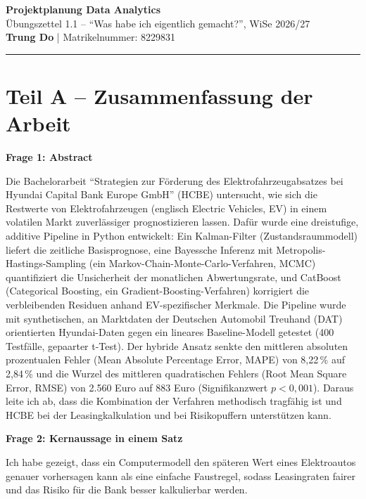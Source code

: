 \documentclass[a4paper,9pt]{article}
\begin{document}
\pagestyle{empty}

\begin{center}
\textbf{\large Projektplanung Data Analytics} \\
\small Übungszettel 1.1 -- \enquote{Was habe ich eigentlich gemacht?}, WiSe 2026/27 \\
\textbf{Trung Do} | Matrikelnummer: 8229831
\end{center}
\vspace{-3mm}
\noindent\rule{\textwidth}{0.3pt}

\section*{Teil A -- Zusammenfassung der Arbeit}

\textbf{Frage 1: Abstract}

Die Bachelorarbeit \enquote{Strategien zur Förderung des Elektrofahrzeugabsatzes bei Hyundai Capital Bank Europe GmbH} (HCBE) untersucht, wie sich die Restwerte von Elektrofahrzeugen (englisch Electric Vehicles, EV) in einem volatilen Markt zuverlässiger prognostizieren lassen. Dafür wurde eine dreistufige, additive Pipeline in Python entwickelt: Ein Kalman-Filter (Zustandsraummodell) liefert die zeitliche Basisprognose, eine Bayessche Inferenz mit Metropolis-Hastings-Sampling (ein Markov-Chain-Monte-Carlo-Verfahren, MCMC) quantifiziert die Unsicherheit der monatlichen Abwertungsrate, und CatBoost (Categorical Boosting, ein Gradient-Boosting-Verfahren) korrigiert die verbleibenden Residuen anhand EV-spezifischer Merkmale. Die Pipeline wurde mit synthetischen, an Marktdaten der Deutschen Automobil Treuhand (DAT) orientierten Hyundai-Daten gegen ein lineares Baseline-Modell getestet (400 Testfälle, gepaarter t-Test). Der hybride Ansatz senkte den mittleren absoluten prozentualen Fehler (Mean Absolute Percentage Error, MAPE) von 8,22\,\% auf 2,84\,\% und die Wurzel des mittleren quadratischen Fehlers (Root Mean Square Error, RMSE) von 2.560 Euro auf 883 Euro (Signifikanzwert $p<0{,}001$). Daraus leite ich ab, dass die Kombination der Verfahren methodisch tragfähig ist und HCBE bei der Leasingkalkulation und bei Risikopuffern unterstützen kann.

\textbf{Frage 2: Kernaussage in einem Satz}

Ich habe gezeigt, dass ein Computermodell den späteren Wert eines Elektroautos genauer vorhersagen kann als eine einfache Faustregel, sodass Leasingraten fairer und das Risiko für die Bank besser kalkulierbar werden.
\end{document}
